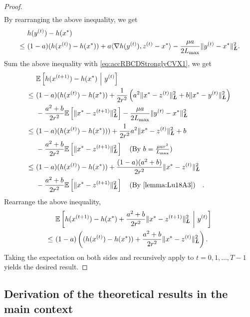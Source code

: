 \begin{proof}
\begin{align*}
\end{align*}
By rearranging the above inequality, we get
\begin{align*}
    &h( y^{(t)} ) - h(x^*)\\ 
    \leq~& (1-a) ( h( x^{(t)} ) - h(x^*) ) + a \langle \nabla h( y^{(t)} ), z^{(t)} - x^* \rangle - \frac{\mu a}{2L_{\max}} \| y^{(t)} - x^* \|^2_{\boldsymbol{L}}.
\end{align*}
Sum the above inequality with \eqref{eq:accRBCDStronglyCVX1}, we get
\begin{align*}
    &\mE \left[ h( x^{(t+1)} ) - h(x^*) ~\Big|~ y^{(t)}  \right] \\
    \leq~& (1-a) ( h( x^{(t)} ) - h(x^{*}) ) + \frac{1}{2r^2} \left( a^2 \| x^* - z^{(t)} \|_{\bL}^2 + b \| x^* - y^{(t)} \|_{\bL}^2 \right)  \\
    & - \frac{a^2 + b}{2r^2} \mE \left[  \| x^* - z^{(t+1)} \|_{\bL}^2 \right] - \frac{\mu a}{2L_{\max}} \| y^{(t)} - x^* \|^2_{\bL} \\
    \leq~& (1-a) ( h( x^{(t)} ) - h(x^{*}) ) ) + \frac{1}{2r^2}  a^2 \| x^* - z^{(t)} \|_{\bL}^2 + b \\
    & - \frac{a^2 + b}{2r^2} \mE \left[  \| x^* - z^{(t+1)} \|_{\bL}^2 \right] \text{(By $b = \frac{\mu a r^2}{L_{\max}}$)} \\
    \leq~& (1-a) ( h( x^{(t)} ) - h(x^{*}) ) + \frac{(1-a)(a^2+b)}{2r^2}  \| x^* - z^{(t)} \|_{\bL}^2 \\
    &- \frac{a^2 + b}{2r^2} \mE \left[  \| x^* - z^{(t+1)} \|_{\bL}^2 \right] \text{(By \autoref{lemma:Lu18A3})}.
\end{align*}
Rearrange the above inequality,
\begin{align*}
    & \mathbb{E} \left[ h( x^{(t+1)} ) - h(x^*) + \frac{a^2 + b}{2r^2}  \| x^* - z^{(t+1)} \|_{\boldsymbol{L}}^2  ~\bigg|~ y^{(t)}   \right] \\
    \leq~& (1-a) \left( ( h( x^{(t)} ) - h(x^{*}) ) + \frac{a^2+b}{2r^2}  \| x^* - z^{(t)} \|_{\boldsymbol{L}}^2 \right).
\end{align*}
Taking the expectation on both sides and recursively apply to $t = 0, 1, \ldots, T-1$ yields the desired result.
\end{proof}

\subsection{Derivation of the theoretical results in the main context} \label{appendix:derivation_main_context}

